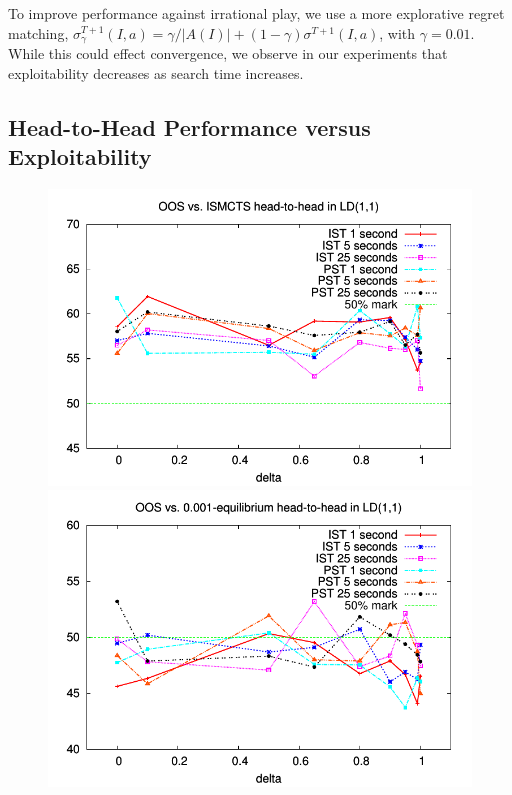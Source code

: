 \documentclass[letterpaper]{article}
\begin{document}
To improve performance against irrational play, we use a more explorative regret matching, 
$\sigma^{T+1}_\gamma(I,a) = \gamma/|A(I)| + (1-\gamma) \sigma^{T+1}(I,a)$, with $\gamma = 0.01$. 
While this could effect convergence, we observe in our experiments that exploitability 
decreases as search time increases.  

\subsection{Head-to-Head Performance versus Exploitability} 

\begin{figure}[t!]
\begin{center}
\includegraphics[scale=0.55]{plots/ismcts-oos-perf} \\
\includegraphics[scale=0.55]{plots/eq-oos-perf} \\

\end{center}
\end{figure}
\end{document}
